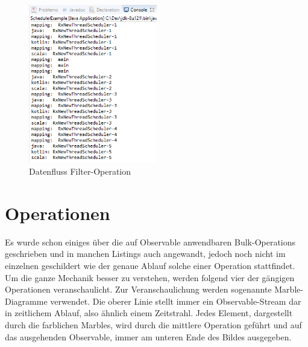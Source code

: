 \begin{figure}
	\centering
	\includegraphics[width=0.5\textwidth]{Abb/threading}
	\caption{Datenfluss Filter-Operation}
	\label{pic:thread}
\end{figure}
\section{Operationen}
Es wurde schon einiges über die auf Observable anwendbaren Bulk-Operations geschrieben und in manchen Listings auch angewandt, jedoch noch nicht im einzelnen geschildert wie der genaue Ablauf solche einer Operation stattfindet. Um die ganze Mechanik besser zu verstehen, werden folgend vier der gängigen Operationen veranschaulicht. Zur Veranschaulichung werden sogenannte Marble-Diagramme verwendet. Die oberer Linie stellt immer ein Observable-Stream dar in zeitlichem Ablauf, also ähnlich einem Zeitstrahl. Jedes Element, dargestellt durch die farblichen Marbles, wird durch die mittlere Operation geführt und auf das ausgehenden Observable, immer am unteren Ende des Bildes ausgegeben. 
